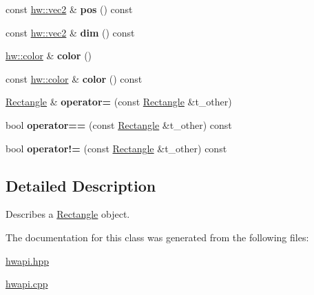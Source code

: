 \begin{DoxyCompactItemize}
const \mbox{\hyperlink{structhw_1_1vec2}{hw\+::vec2}} \& {\bfseries pos} () const
\item 
\mbox{\label{classdummy__api_1_1Rectangle_acb4a7fa6e50bcb1ec5368e88f73a24a7}} 
const \mbox{\hyperlink{structhw_1_1vec2}{hw\+::vec2}} \& {\bfseries dim} () const
\item 
\mbox{\label{classdummy__api_1_1Rectangle_a570fc10f9e8463b0469f99259a2840f0}} 
\mbox{\hyperlink{structhw_1_1color}{hw\+::color}} \& {\bfseries color} ()
\item 
\mbox{\label{classdummy__api_1_1Rectangle_ae779e34d36d5de59679fe948d00e1df8}} 
const \mbox{\hyperlink{structhw_1_1color}{hw\+::color}} \& {\bfseries color} () const
\item 
\mbox{\label{classdummy__api_1_1Rectangle_a7deb9fa0985793f6a7de4e12116d4c46}} 
\mbox{\hyperlink{classdummy__api_1_1Rectangle}{Rectangle}} \& {\bfseries operator=} (const \mbox{\hyperlink{classdummy__api_1_1Rectangle}{Rectangle}} \&t\+\_\+other)
\item 
\mbox{\label{classdummy__api_1_1Rectangle_a88dbaecb49708c6f0b11a9c385a57cd3}} 
bool {\bfseries operator==} (const \mbox{\hyperlink{classdummy__api_1_1Rectangle}{Rectangle}} \&t\+\_\+other) const
\item 
\mbox{\label{classdummy__api_1_1Rectangle_a3e8455e5a497ffe7e543913036932987}} 
bool {\bfseries operator!=} (const \mbox{\hyperlink{classdummy__api_1_1Rectangle}{Rectangle}} \&t\+\_\+other) const
\end{DoxyCompactItemize}


\subsection{Detailed Description}
Describes a \mbox{\hyperlink{classdummy__api_1_1Rectangle}{Rectangle}} object. 

The documentation for this class was generated from the following files\+:\begin{DoxyCompactItemize}
\item 
\mbox{\hyperlink{hwapi_8hpp}{hwapi.\+hpp}}\item 
\mbox{\hyperlink{hwapi_8cpp}{hwapi.\+cpp}}\end{DoxyCompactItemize}
